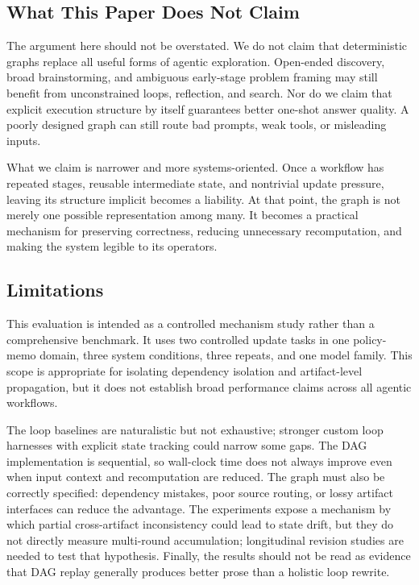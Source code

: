 \documentclass{article}
\begin{document}
\subsection{What This Paper Does Not Claim}

The argument here should not be overstated. We do not claim that deterministic graphs replace all useful forms of agentic exploration. Open-ended discovery, broad brainstorming, and ambiguous early-stage problem framing may still benefit from unconstrained loops, reflection, and search. Nor do we claim that explicit execution structure by itself guarantees better one-shot answer quality. A poorly designed graph can still route bad prompts, weak tools, or misleading inputs.

What we claim is narrower and more systems-oriented. Once a workflow has repeated stages, reusable intermediate state, and nontrivial update pressure, leaving its structure implicit becomes a liability. At that point, the graph is not merely one possible representation among many. It becomes a practical mechanism for preserving correctness, reducing unnecessary recomputation, and making the system legible to its operators.

\subsection{Limitations}

This evaluation is intended as a controlled mechanism study rather than a comprehensive benchmark. It uses two controlled update tasks in one policy-memo domain, three system conditions, three repeats, and one model family. This scope is appropriate for isolating dependency isolation and artifact-level propagation, but it does not establish broad performance claims across all agentic workflows.

The loop baselines are naturalistic but not exhaustive; stronger custom loop harnesses with explicit state tracking could narrow some gaps. The DAG implementation is sequential, so wall-clock time does not always improve even when input context and recomputation are reduced. The graph must also be correctly specified: dependency mistakes, poor source routing, or lossy artifact interfaces can reduce the advantage. The experiments expose a mechanism by which partial cross-artifact inconsistency could lead to state drift, but they do not directly measure multi-round accumulation; longitudinal revision studies are needed to test that hypothesis. Finally, the results should not be read as evidence that DAG replay generally produces better prose than a holistic loop rewrite.
\end{document}
